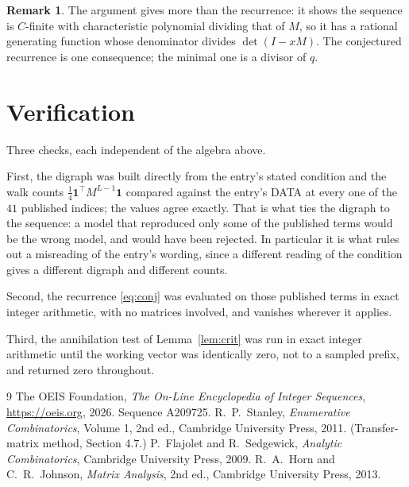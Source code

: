 \documentclass[11pt,a4paper]{article}
\theoremstyle{plain}
\theoremstyle{definition}
\newtheorem{remark}[theorem]{Remark}
\begin{document}
\begin{remark}
The argument gives more than the recurrence: it shows the sequence is $C$-finite with
characteristic polynomial dividing that of $M$, so it has a rational generating function
whose denominator divides $\det(I-xM)$. The conjectured recurrence is one consequence; the
minimal one is a divisor of $q$.
\end{remark}

\section{Verification}

Three checks, each independent of the algebra above.

First, the digraph was built directly from the entry's stated condition and the walk counts
$\tfrac1{4}\mathbf{1}^{\!\top}M^{L-1}\mathbf{1}$ compared against the entry's DATA at
every one of the $41$ published indices; the values agree exactly. That is what ties
the digraph to the sequence: a model that reproduced only some of the published terms would
be the wrong model, and would have been rejected. In particular it is what rules out a
misreading of the entry's wording, since a different reading of the condition gives a
different digraph and different counts.

Second, the recurrence \eqref{eq:conj} was evaluated on those published terms in exact
integer arithmetic, with no matrices involved, and vanishes wherever it applies.

Third, the annihilation test of Lemma~\ref{lem:crit} was run in exact integer arithmetic
until the working vector was identically zero, not to a sampled prefix, and returned zero
throughout.

\begin{thebibliography}{9}
 The OEIS Foundation, \emph{The On-Line Encyclopedia of Integer
Sequences}, \url{https://oeis.org}, 2026. Sequence A209725.
 R.~P.~Stanley, \emph{Enumerative Combinatorics}, Volume 1, 2nd ed.,
Cambridge University Press, 2011. (Transfer-matrix method, Section 4.7.)
 P.~Flajolet and R.~Sedgewick, \emph{Analytic Combinatorics}, Cambridge
University Press, 2009.
 R.~A.~Horn and C.~R.~Johnson, \emph{Matrix Analysis}, 2nd ed., Cambridge
University Press, 2013.
\end{thebibliography}
\end{document}

